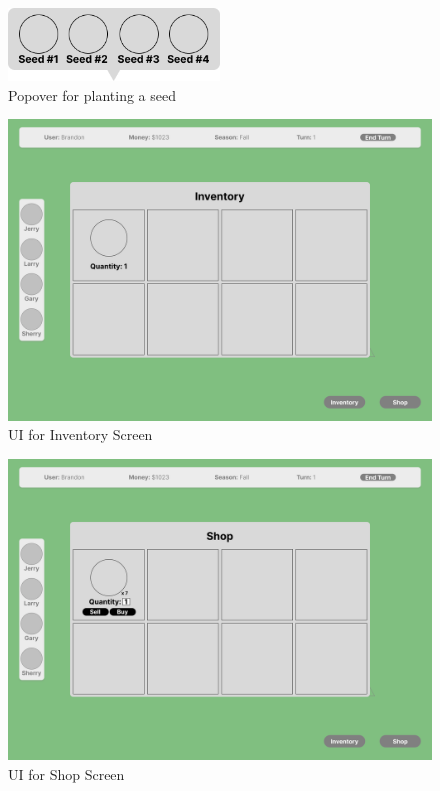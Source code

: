 \documentclass[12pt, titlepage]{article}
\begin{document}
\begin{figure}[H]
\centering
\includegraphics[width=0.5\textwidth]{plant.png}
\caption{Popover for planting a seed}
\label{FigUH}
\end{figure}

\begin{figure}[H]
\centering
\includegraphics[width=1\textwidth]{inv.png}
\caption{UI for Inventory Screen}
\label{FigUH}
\end{figure}

\begin{figure}[H]
\centering
\includegraphics[width=1\textwidth]{shop.png}
\caption{UI for Shop Screen}
\label{FigUH}
\end{figure}
\end{document}
